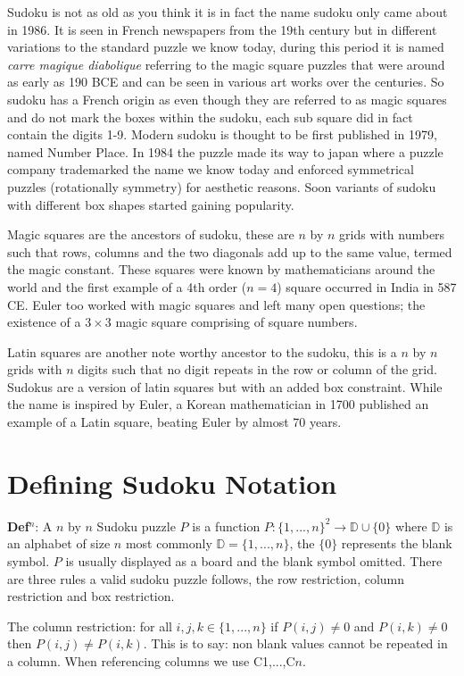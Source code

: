 \documentclass[a4paper,11pt]{report}
\newcounter{row}
\newcounter{col}
\begin{document}
Sudoku is not as old as you think it is in fact the name sudoku only came about in 1986. It is seen in French newspapers from the 19th century but in different variations to the standard puzzle we know today, during this period it is named \textit{carre magique diabolique} referring to the magic square puzzles that were around as early as 190 BCE and can be seen in various art works over the centuries. So sudoku has a French origin as even though they are referred to as magic squares and do not mark the boxes within the sudoku, each sub square did in fact contain the digits 1-9. Modern sudoku is thought to be first published in 1979, named Number Place. In 1984 the puzzle made its way to japan where a puzzle company trademarked the name we know today and enforced symmetrical puzzles (rotationally symmetry) for aesthetic reasons. Soon variants of sudoku with different box shapes started gaining popularity.

Magic squares are the ancestors of sudoku, these are $n$ by $n$ grids with numbers such that rows, columns and the two diagonals add up to the same value, termed the magic constant. These squares were known by mathematicians around the world and the first example of a 4th order ($n=4$) square occurred in India in 587 CE. Euler too worked with magic squares and left many open questions; the existence of a $3\times 3$ magic square comprising of square numbers.

Latin squares are another note worthy ancestor to the sudoku, this is a $n$ by $n$ grids with $n$ digits such that no digit repeats in the row or column of the grid. Sudokus are a version of latin squares but with an added box constraint. While the name is inspired by Euler, a  Korean mathematician in 1700 published an example of a Latin square, beating Euler by almost 70 years. 
	
\section{Defining Sudoku Notation}
	
\textbf{Def$^n$}: A $n$ by $n$ Sudoku puzzle $P$ is a function $P:  \{1,...,n\}^2\rightarrow\mathbb D \cup \{0\}$ where $\mathbb D$ is an alphabet of size $n$ most commonly $\mathbb D = \{1,...,n\}$, the $\{0\}$ represents the blank symbol. $P$ is usually displayed as a board and the blank symbol omitted. There are three rules a valid sudoku puzzle follows, the row restriction, column restriction and box restriction.

The column restriction: for all $i,j,k\in \{1,...,n\}$ if $P(i,j)\neq0$ and $P(i,k)\neq0$ then $P(i,j)\neq P(i,k)$. This is to say: non blank values cannot be repeated in a column. When referencing columns we use C1,...,C$n$.
\end{document}
